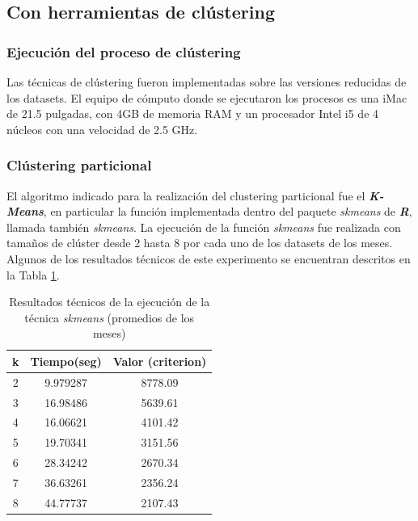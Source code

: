 \documentclass[12pt]{article}
\numberwithin{equation}{section}
\numberwithin{table}{section}
\numberwithin{figure}{section}
\begin{document}
\pagebreak
\subsection{Con herramientas de clústering}
\subsubsection{Ejecución del proceso de clústering}
Las técnicas de clústering fueron implementadas sobre las versiones reducidas de los datasets. El equipo de cómputo donde se ejecutaron los procesos es una iMac de 21.5 pulgadas, con 4GB de memoria RAM y un procesador Intel i5 de 4 núcleos con una velocidad de 2.5 GHz.

\subsubsection{Clústering particional}
El algoritmo indicado para la realización del clustering particional fue el \textbf{\emph{K-Means}}, en particular la función implementada dentro del paquete \emph{skmeans} de \emph{\textbf{R}}, llamada también \emph{skmeans}.
La ejecución de la función \emph{skmeans} fue realizada con tamaños de clúster desde 2 hasta 8 por cada uno de los datasets de los meses.
Algunos de los resultados técnicos de este experimento se encuentran descritos en la Tabla \ref{tbl:resultados-particional}.

\begin{table}[h]
\centering
\begin{tabular}{@{}ccc@{}}
\toprule
\textbf{k} & \textbf{Tiempo(seg)} & \textbf{Valor (criterion)} \\ \midrule
2          & 9.979287             & 8778.09                    \\
3          & 16.98486             & 5639.61                    \\
4          & 16.06621             & 4101.42                    \\
5          & 19.70341             & 3151.56                    \\
6          & 28.34242             & 2670.34                    \\
7          & 36.63261             & 2356.24                    \\
8          & 44.77737             & 2107.43                    \\ \bottomrule
\end{tabular}
\caption{Resultados técnicos de la ejecución de la técnica \emph{skmeans} (promedios de los meses)}
\label{tbl:resultados-particional}
\end{table}
\end{document}
